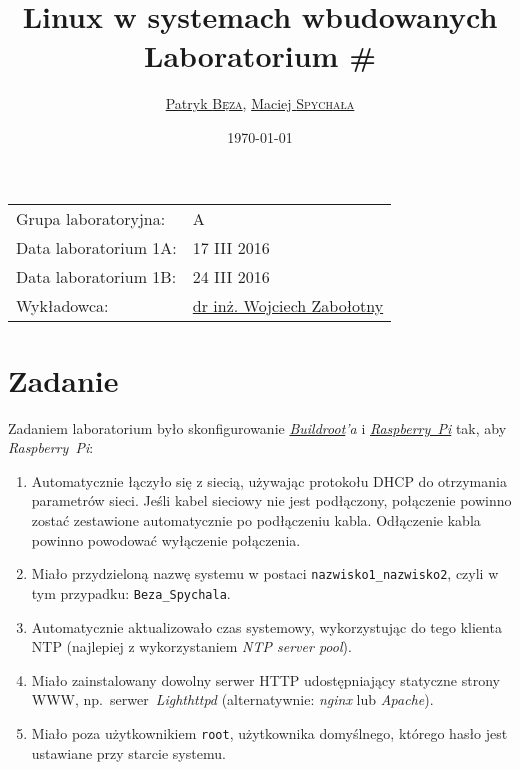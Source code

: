 \documentclass{article}
\title{Linux w systemach wbudowanych\\Laboratorium \#\labnumber}
\author{\href{mailto:bezap@student.mini.pw.edu.pl}{Patryk \textsc{Bęza}}, \href{mailto:spychalam@student.mini.pw.edu.pl}{Maciej \textsc{Spychała}}}
\date{\today}
\newcommand{\labnumber}{1}
\begin{document}
\maketitle

\begin{center}
\begin{tabular}{ll}
Grupa laboratoryjna: & A\\
Data laboratorium \labnumber A: & 17 III 2016\\
Data laboratorium \labnumber B: & 24 III 2016\\
Wykładowca: & \href{mailto:wzab@ise.pw.edu.pl}{dr inż. Wojciech Zabołotny}
\end{tabular}
\end{center}



\section{Zadanie}
\label{task}

Zadaniem laboratorium było skonfigurowanie \emph{\href{https://buildroot.org/}{Buildroot}'a} i \emph{\href{https://www.raspberrypi.org/}{Raspberry~Pi}} tak, aby \emph{Raspberry~Pi}:

\begin{enumerate}
\item Automatycznie łączyło się z siecią, używając protokołu DHCP do otrzymania parametrów sieci. Jeśli kabel sieciowy nie jest podłączony, połączenie powinno zostać zestawione automatycznie po podłączeniu kabla. Odłączenie kabla powinno powodować wyłączenie połączenia.
\item Miało przydzieloną nazwę systemu w postaci \texttt{nazwisko1\_nazwisko2}, czyli w tym przypadku: \texttt{Beza\_Spychala}.
\item Automatycznie aktualizowało czas systemowy, wykorzystując do tego klienta NTP (najlepiej z wykorzystaniem \emph{NTP server pool}).
\item Miało zainstalowany dowolny serwer HTTP udostępniający statyczne strony WWW, np.~serwer~\emph{Lighthttpd} (alternatywnie: \emph{nginx} lub \emph{Apache}).
\item Miało poza użytkownikiem \texttt{root}, użytkownika domyślnego, którego hasło jest ustawiane przy starcie systemu.
\end{enumerate}
\end{document}
